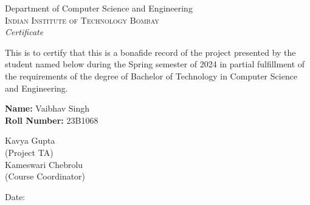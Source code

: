 \newpage
\thispagestyle{empty}

\begin{center}

\huge{Department of Computer Science and Engineering}\\[0.5cm]
\normalsize
\textsc{Indian Institute of Technology Bombay}\\[2.0cm]

\emph{\LARGE Certificate}\\[2.5cm]
\end{center}
\normalsize This is to certify that this is a bonafide record of the project presented by the student named below during the Spring semester of 2024 in partial fulfillment of the requirements of the degree of Bachelor of Technology in Computer Science and Engineering.\\[1.0cm]

\begin{center}
    \textbf{Name: }Vaibhav Singh  \\  
    \textbf{Roll Number: } 23B1068
\end{center}


\vfill


\begin{flushright}
Kavya Gupta\\
(Project TA)\\[1.5cm]
Kameswari Chebrolu\\
(Course Coordinator)\\
\end{flushright}

\begin{flushleft}
Date:
\end{flushleft}
